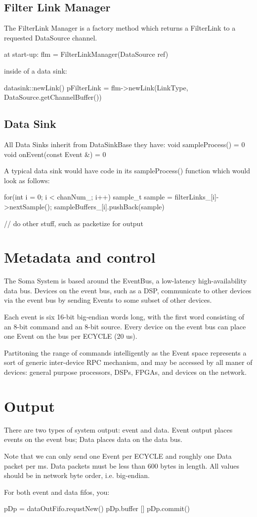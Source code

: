 \subsection{Filter Link Manager}
The FilterLink Manager is a factory method which returns a FilterLink to a requested DataSource channel. 

at start-up:
  flm = FilterLinkManager(DataSource ref) 
  
inside of a data sink: 

datasink::newLink()
   pFilterLink = flm->newLink(LinkType, DataSource.getChannelBuffer())


\subsection{Data Sink}
All Data Sinks inherit from DataSinkBase
they have: 
  void sampleProcess() = 0 
  void onEvent(const Event &) = 0


A typical data sink would have code in its sampleProcess() function
which would look as follows:

for(int i = 0; i < chanNum_; i++) {
   sample_t sample = filterLinks_[i]->nextSample(); 
   sampleBuffers_[i].pushBack(sample)
}

// do other stuff, such as packetize for output


\section{Metadata and control}
The Soma System is based around the EventBus, a low-latency
high-availability data bus. Devices on the event bus, such as a DSP,
communicate to other devices via the event bus by sending Events to
some subset of other devices.

Each event is six 16-bit big-endian words long, with the first word
consisting of an 8-bit command and an 8-bit source. Every device on
the event bus can place one Event on the bus per ECYCLE (20 us).

Partitoning the range of commands intelligently as the Event space
represents a sort of generic inter-device RPC mechanism, and may be
accessed by all maner of devices: general purpose processors, DSPs,
FPGAs, and devices on the network.


\section{Output} 
There are two types of system output: event and data. Event output
places events on the event bus; Data places data on the data bus.

Note that we can only send one Event per ECYCLE and roughly one Data
packet per ms. Data packets must be less than 600 bytes in length. All
values should be in network byte order, i.e. big-endian. 

For both event and data fifos, you: 

pDp = dataOutFifo.requstNew()
pDp.buffer []
pDp.commit()
